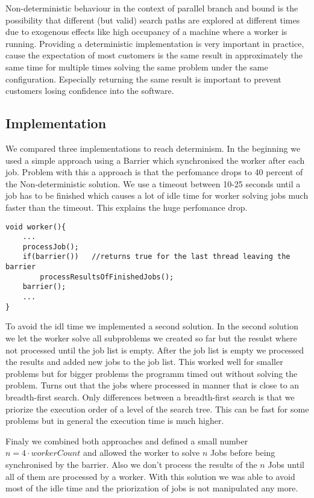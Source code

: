 \documentclass[sigconf]{acmart}
\begin{document}
Non-deterministic behaviour in the context of parallel branch and bound is the possibility that different (but valid) search paths are explored at different times due to exogenous effects like high occupancy of a machine where a worker is running. Providing a deterministic implementation is very important in practice, cause the expectation of most customers is the same result in approximately the same time for multiple times solving the same problem under the same configuration. Especially returning the same result is important to prevent customers losing confidence into the software.

\subsection{Implementation}

We compared three implementations to reach determinism. In the beginning we used a simple approach using a Barrier which synchronised the worker after each job. Problem with this a approach is that the perfomance drops to 40 percent of the Non-deterministic solution.  We use a timeout between 10-25 seconds until a job has to be finished which causes a lot of idle time for worker solving jobs much faster than the timeout. This explains the huge perfomance drop.

\begin{lstlisting}
void worker(){
	...
	processJob();
	if(barrier())	//returns true for the last thread leaving the barrier
		processResultsOfFinishedJobs();
	barrier();
	...
}
\end{lstlisting}

To avoid the idl time we implemented a second solution. In the second solution we let the worker solve all subproblems we created so far but the resulst where not processed until the job list is empty. After the job list is empty we processed the results and added new jobs to the job list. This worked well for smaller problems but for bigger problems the programm timed out without solving the problem. Turns out that the jobs where processed in manner that is close to an breadth-first search. Only differences between a breadth-first search is that we priorize the execution order of a level of the search tree. This can be fast for some problems but in general the execution time is much higher. \cite{gurski2018distributed}

Finaly we combined both approaches and defined a small number $n=4\cdot workerCount$ and allowed the worker to solve $n$ Jobs before being synchronised by the barrier. Also we don't process the results of the $n$ Jobs until all of them are processed by a worker. With this solution we was able to avoid most of the idle time and the priorization of jobs is not manipulated any more. 
\end{document}
